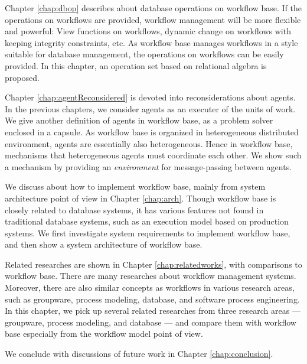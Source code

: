 Chapter \ref{chap:dbop} describes about database operations on workflow
base.  If the operations on workflows are provided, workflow management
will be more flexible and powerful: View functions on workflows,
dynamic change on workflows with keeping integrity constraints, etc.
As workflow base manages workflows in a style suitable for database
management, the operations on workflows can be easily provided.  In this 
chapter, an operation set based on relational algebra is proposed.

Chapter \ref{chap:agentReconsidered} is devoted into reconsiderations about
agents.  In the previous chapters, we consider agents as an executer of
the units of work.  We give another definition of agents in workflow
base, as a problem solver enclosed in a capsule.  As workflow base is
organized in heterogeneous distributed environment, agents are
essentially also heterogeneous.  Hence in workflow base, mechanisms that
heterogeneous agents must coordinate each other.  We show such a
mechanism by providing an {\em environment} for message-passing between
agents.

We discuss about how to implement workflow base, mainly from system
architecture point of view in Chapter \ref{chap:arch}.  Though workflow
base is closely related to database systems, it has various features not
found in traditional database systems, such as an execution model based
on production systems.  We first investigate system requirements to
implement workflow base, and then show a system architecture of workflow
base.

Related researches are shown in Chapter \ref{chap:relatedworks}, with
comparisons to workflow base.  There are many researches about workflow
management systems.  Moreover, there are also similar concepts as
workflows in various research areas, such as groupware, process
modeling, database, and software process engineering.  In this chapter,
we pick up several related researches from three research areas ---
groupware, process modeling, and database --- and compare them with
workflow base especially from the workflow model point of view.

We conclude with discussions of future work in Chapter
\ref{chap:conclusion}.
